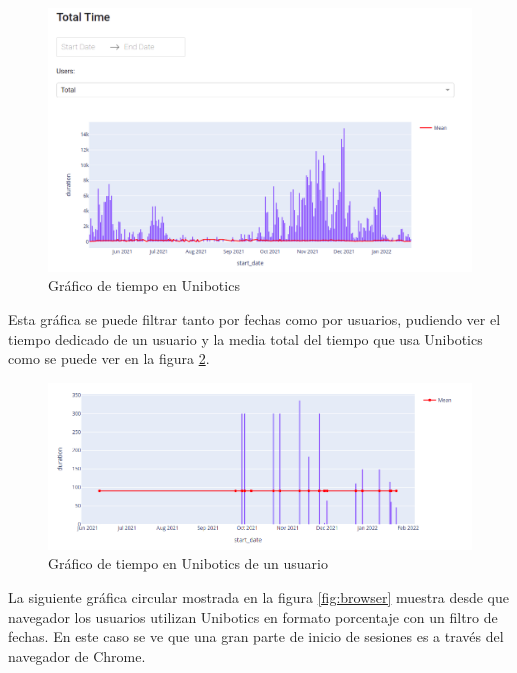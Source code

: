 \begin{figure}[H]
    \centering
    \includegraphics[width=18cm, keepaspectratio]{img/time.png}
    \caption{Gráfico de tiempo en Unibotics}
    \label{fig:time}
\end{figure}
Esta gráfica se puede filtrar tanto por fechas como por usuarios, pudiendo ver el tiempo dedicado de un usuario y la media total del tiempo que usa Unibotics como se puede ver en la figura \ref{fig:time_user}.

\begin{figure}[H]
    \centering
    \includegraphics[width=18cm, keepaspectratio]{img/time_user.png}
    \caption{Gráfico de tiempo en Unibotics de un usuario}
    \label{fig:time_user}
\end{figure}

La siguiente gráfica circular mostrada en la figura \ref{fig:browser} muestra desde que navegador los usuarios utilizan Unibotics en formato porcentaje con un filtro de fechas. En este caso se ve que una gran parte de inicio de sesiones es a través del navegador de Chrome.



